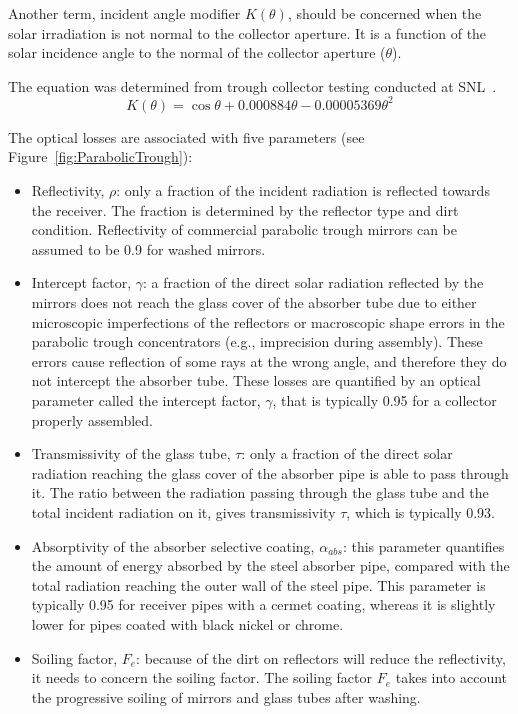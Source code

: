 Another term, incident angle modifier $K(\theta)$, should be concerned when the solar irradiation is not normal to the collector aperture. It is a function of the solar incidence angle to the normal of the collector aperture ($\theta$).

The equation was determined from trough collector testing conducted at SNL~\cite{Dudley1994}.
\begin{equation}
  K(\theta) = \cos\theta+0.000884\theta-0.00005369\theta^2
\end{equation}

The optical losses are associated with five parameters (see Figure~\ref{fig:ParabolicTrough}):

\begin{itemize}
  \item Reflectivity, $\rho$: only a fraction of the incident radiation is reflected towards the receiver. The fraction is determined by the reflector type and dirt condition. Reflectivity of commercial parabolic trough mirrors can be assumed to be 0.9 for washed mirrors. 
  \item Intercept factor, $\gamma$: a fraction of the direct solar radiation reflected by the mirrors does not reach the glass cover of the absorber tube due to either microscopic imperfections of the reflectors or macroscopic shape errors in the parabolic trough concentrators (e.g., imprecision during assembly). These errors cause reflection of some rays at the wrong angle, and therefore they do not intercept the absorber tube. These losses are quantified by an optical parameter called the intercept factor, $\gamma$, that is typically 0.95 for a collector properly assembled.
  \item Transmissivity of the glass tube, $\tau$: only a fraction of the direct solar radiation reaching the glass cover of the absorber pipe is able to pass through it. The ratio between the radiation passing through the glass tube and the total incident radiation on it, gives transmissivity $\tau$,  which is typically 0.93.
  \item Absorptivity of the absorber selective coating, $\alpha_{abs}$: this parameter quantifies the amount of energy absorbed by the steel absorber pipe, compared with the total radiation reaching the outer wall of the steel pipe. This parameter is typically 0.95 for receiver pipes with a cermet coating, whereas it is slightly lower for pipes coated with black nickel or chrome.
  \item Soiling factor, $F_e$: because of the dirt on reflectors will reduce the reflectivity, it needs to concern the soiling factor. The soiling factor $F_e$ takes into account the progressive soiling of mirrors and glass tubes after washing.
\end{itemize}

